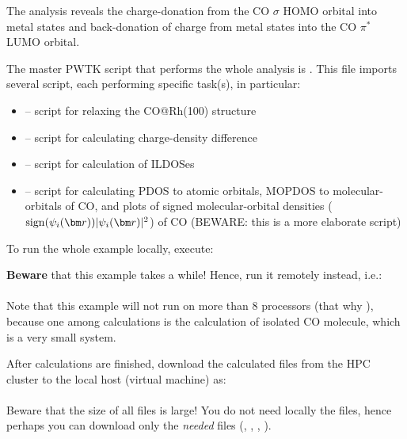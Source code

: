 \documentclass[landscape]{foils}
\begin{document}
The analysis reveals the charge-donation from the CO $\sigma$ HOMO
orbital into metal states and back-donation of charge from metal
states into the CO $\pi^*$ LUMO orbital.

The master PWTK script that performs the whole analysis is
. This file imports several script, each performing
specific task(s), in particular:

\begin{itemize}
\vspace{-0.5em}
\item {} -- script for relaxing the CO@Rh(100)
  structure
\vspace{-0.5em}
\item {} -- script for calculating charge-density
  difference
\vspace{-0.5em}
\item {} -- script for calculation of ILDOSes
\vspace{-0.5em}
\item {} -- script for calculating PDOS to atomic
  orbitals, MOPDOS to molecular-orbitals of CO, and plots of signed
  molecular-orbital densities ($\sign(\psi_i(\vr))|\psi_i(\vr)|^2$) of
  CO (BEWARE: this is a more elaborate script)
\end{itemize}


To run the whole example locally, execute:\\[0.5em]

{\bf Beware} that this example takes a while! Hence, run it remotely
instead, i.e.:\\[0.5em]
\\[0.5em]
Note that this example will not run on more than 8 processors (that
why ), because one among calculations is the calculation
of isolated CO molecule, which is a very small system.

After calculations are finished, download the calculated files from the
HPC cluster to the local
host (virtual machine) as:\\[0.5em]
\\[0.5em]
Beware that the size of all files is large! You do not need locally
the  files, hence perhaps you can download only the
{\it needed} files (, , ,
).
\end{document}
